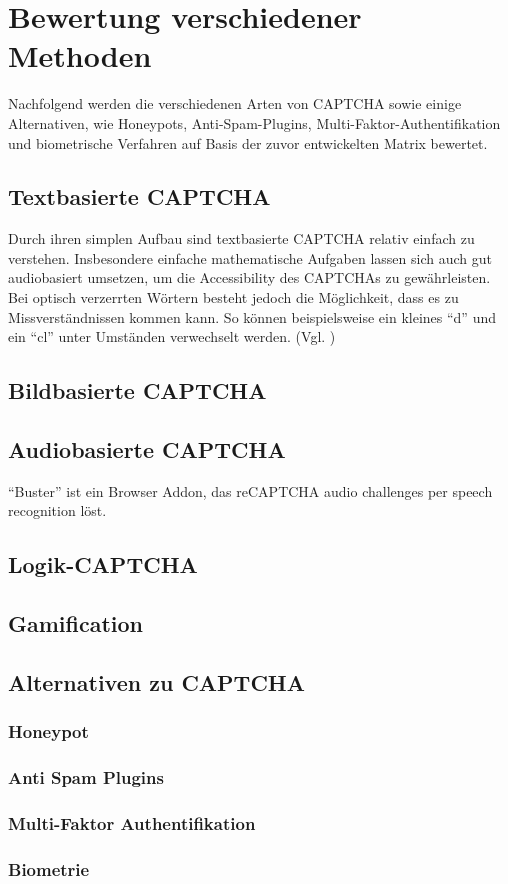 \chapter{Bewertung verschiedener Methoden}

Nachfolgend werden die verschiedenen Arten von CAPTCHA sowie einige Alternativen, wie Honeypots, Anti-Spam-Plugins, 
Multi-Faktor-Authentifikation und biometrische Verfahren auf Basis der zuvor entwickelten Matrix bewertet. 

\section{Textbasierte CAPTCHA}

Durch ihren simplen Aufbau sind textbasierte CAPTCHA relativ einfach zu verstehen.
Insbesondere einfache mathematische Aufgaben lassen sich auch gut audiobasiert umsetzen, 
um die Accessibility des CAPTCHAs zu gewährleisten.
Bei optisch verzerrten Wörtern besteht jedoch die Möglichkeit, dass es zu Missverständnissen kommen kann.
So können beispielsweise ein kleines ``d'' und ein ``cl'' unter Umständen verwechselt werden. (Vgl. \cite[p.3]{usabilityofcaptchas})

\section{Bildbasierte CAPTCHA}

\section{Audiobasierte CAPTCHA}

“Buster” ist ein Browser Addon, das reCAPTCHA audio challenges per speech recognition löst.

\section{Logik-CAPTCHA}

\section{Gamification}

\section{Alternativen zu CAPTCHA}

\subsection{Honeypot}

\subsection{Anti Spam Plugins}

\subsection{Multi-Faktor Authentifikation}

\subsection{Biometrie}